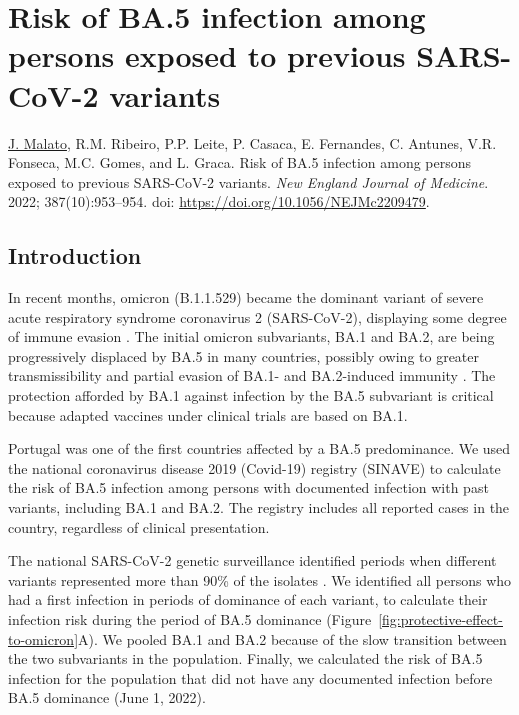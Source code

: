 \chapter{Risk of BA.5 infection among persons exposed to previous SARS-CoV-2 variants}
\label{chapter:2022-covid19-01}

\noindent\underline{J. Malato}, R.M. Ribeiro, P.P. Leite, P. Casaca, E. Fernandes, C. Antunes, V.R. Fonseca, M.C. Gomes, and L. Graca. Risk of BA.5 infection among persons exposed to previous SARS-CoV-2 variants. \textit{New England Journal of Medicine}. 2022; 387(10):953--954. doi: \url{https://doi.org/10.1056/NEJMc2209479}.



\section{Introduction}

In recent months, omicron (B.1.1.529) became the dominant variant of severe acute respiratory syndrome coronavirus 2 (SARS-CoV-2), displaying some degree of immune evasion \citep{qu2022NeutralizationSARSCoV2}. The initial omicron subvariants, BA.1 and BA.2, are being progressively displaced by BA.5 in many countries, possibly owing to greater transmissibility and partial evasion of BA.1- and BA.2-induced immunity \citep{yu2022NeutralizationSARSCoV2,cao2022BA12}. The protection afforded by BA.1 against infection by the BA.5 subvariant is critical because adapted vaccines under clinical trials are based on BA.1.

Portugal was one of the first countries affected by a BA.5 predominance. We used the national coronavirus disease 2019 (Covid-19) registry (SINAVE) to calculate the risk of BA.5 infection among persons with documented infection with past variants, including BA.1 and BA.2. The registry includes all reported cases in the country, regardless of clinical presentation.

The national SARS-CoV-2 genetic surveillance identified periods when different variants represented more than 90\% of the isolates \citep{institutonacionaldesaudedoutorricardojorge2022GeneticDiversity}. We identified all persons who had a first infection in periods of dominance of each variant, to calculate their infection risk during the period of BA.5 dominance (Figure~\ref{fig:protective-effect-to-omicron}A). We pooled BA.1 and BA.2 because of the slow transition between the two subvariants in the population. Finally, we calculated the risk of BA.5 infection for the population that did not have any documented infection before BA.5 dominance (June 1, 2022).

